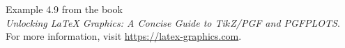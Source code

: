 \documentclass{article}
\begin{document}
Example 4.9 from the book\\
\emph{Unlocking LaTeX Graphics: A Concise Guide to Ti$k$Z/PGF and PGFPLOTS}.\\
For more information, visit \url{https://latex-graphics.com}.
\par\bigskip

\end{document}
